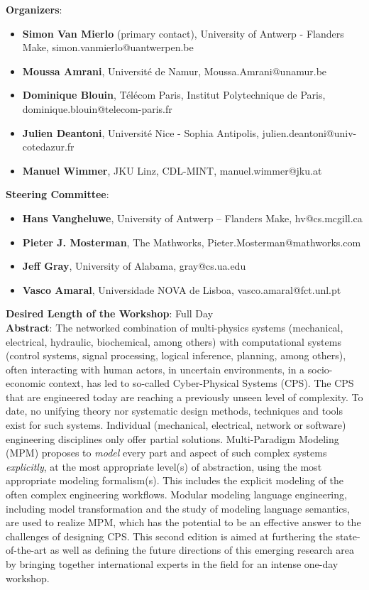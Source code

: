 \noindent
\textbf{Organizers}:
\begin{itemize}
    \item \textbf{Simon Van Mierlo} (primary contact), University of Antwerp - Flanders Make, simon.vanmierlo@uantwerpen.be
    \item \textbf{Moussa Amrani}, Universit\'e de Namur, Moussa.Amrani@unamur.be
    \item \textbf{Dominique Blouin}, T\'el\'ecom Paris, Institut Polytechnique de Paris, dominique.blouin@telecom-paris.fr
    \item \textbf{Julien Deantoni}, Universit\'e Nice - Sophia Antipolis, julien.deantoni@univ-cotedazur.fr
    \item \textbf{Manuel Wimmer}, JKU Linz, CDL-MINT, manuel.wimmer@jku.at
\end{itemize}

\noindent
\textbf{Steering Committee}:
\begin{itemize}
    \item \textbf{Hans Vangheluwe}, University of Antwerp – Flanders Make, hv@cs.mcgill.ca
    \item \textbf{Pieter J. Mosterman}, The Mathworks, Pieter.Mosterman@mathworks.com
    \item \textbf{Jeff Gray}, University of Alabama, gray@cs.ua.edu
    \item \textbf{Vasco Amaral}, Universidade NOVA de Lisboa, vasco.amaral@fct.unl.pt
\end{itemize}

\noindent
\textbf{Desired Length of the Workshop}: Full Day \\

\noindent
\textbf{Abstract}: The networked combination of multi-physics systems (mechanical, 
electrical, hydraulic, biochemical, among others) with computational systems 
(control systems, signal processing, logical inference, planning, among others), 
often interacting with human actors, in uncertain environments, in a socio-economic 
context, has led to so-called Cyber-Physical Systems (CPS).
The CPS that are engineered today are reaching a previously unseen level of 
complexity.
To date, no unifying theory nor systematic design methods, techniques and tools 
exist for such systems.
Individual (mechanical, electrical, network or software) engineering disciplines 
only offer partial solutions.
Multi-Paradigm Modeling (MPM) proposes to \emph{model} every part and aspect of 
such complex systems \emph{explicitly}, at the most appropriate level(s) of 
abstraction, using the most appropriate modeling formalism(s).
This includes the explicit modeling of the often complex engineering workflows.
Modular modeling language engineering, including model transformation and the 
study of modeling language semantics, are used to realize MPM, which has the 
potential to be an effective answer to the challenges of designing CPS.
This second edition is aimed at furthering the state-of-the-art as well as 
defining the future directions of this emerging research area by bringing together 
international experts in the field for an intense one-day workshop.

